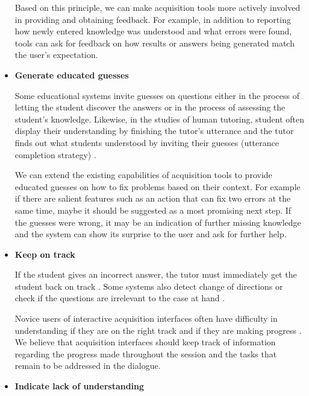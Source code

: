 \documentclass{llncs}
\begin{document}
\begin{itemize}
\vspace*{0.5em}
Based on this principle, we can make acquisition tools more actively
involved in providing and obtaining feedback.  For example, in addition to
reporting how newly entered knowledge was understood and what errors were
found, tools can ask for feedback on how results or answers being generated
match the user's expectation.

\vspace*{0.5em}
\item {\bf Generate educated guesses} 

Some educational systems invite guesses on questions 
either in the process of letting the student discover the answers
\cite{quadratic} or in the process of assessing the student's
knowledge\cite{Aleven00}.  
Likewise, in the studies of human tutoring, student often display their
understanding by finishing the tutor's utterance and the tutor finds out what
students understood by inviting their guesses (utterance completion
strategy) \cite{Fox93}.  

\vspace*{0.5em}
We can extend the existing capabilities of acquisition tools to provide
educated guesses on how to fix problems based on their context.  For example
if there are salient features such as an action that can fix two errors at the
same time, maybe it should be suggested as a most promising next step.  If the
guesses were wrong, it may be an indication of further missing knowledge and
the system can show its surprise to the user and ask for further help.

\vspace*{0.5em}
\item {\bf Keep on track}

If the student gives an incorrect answer, the tutor must immediately get the
student back on track \cite{Carbonell70}.  Some systems also detect change of
directions \cite{WoolfA00} or check if the questions are irrelevant to the
case at hand \cite{Clancey87}.

\vspace*{0.5em}
Novice users of interactive acquisition interfaces often have difficulty in
understanding if they are on the right track and if they are making progress
\cite{KimG00}.  We believe that acquisition interfaces should keep track of
information regarding the progress made throughout the session and the tasks
that remain to be addressed in the dialogue.


\vspace*{0.5em}
\item {\bf Indicate lack of understanding}  
\label{indicate-lack-of-understanding}


\end{itemize}
\end{document}
